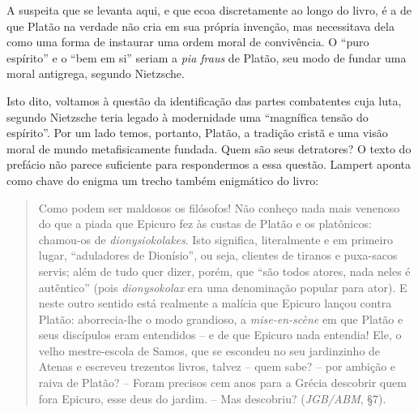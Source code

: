 \documentclass[
	12pt,				%
	openright,			%
	oneside,			%
	a4paper,			%
	english,			%
	french,				%
	spanish,			%
	brazil				%
	]{abntex2}
\begin{document}
	A suspeita que se levanta aqui, e que ecoa discretamente ao longo do livro, é a de que Platão na verdade não cria em sua própria invenção, mas necessitava dela como uma forma de instaurar uma ordem moral de convivência. O “puro espírito” e o “bem em si” seriam a \textit{pia fraus} de Platão, seu modo de fundar uma moral antigrega, segundo Nietzsche. 
	
	Isto dito, voltamos à questão da identificação das partes combatentes cuja luta, segundo Nietzsche teria legado à modernidade uma “magnífica tensão do espírito”. Por um lado temos, portanto, Platão, a tradição cristã e uma visão moral de mundo metafisicamente fundada. Quem são seus detratores? O texto do prefácio não parece suficiente para respondermos a essa questão. Lampert aponta como chave do enigma um trecho também enigmático do livro:

\begin{quotation}
Como podem ser maldosos os filósofos! Não conheço nada mais venenoso do que a piada que Epicuro fez às custas de Platão e os platônicos: chamou-os de \textit{dionysiokolakes}. Isto significa, literalmente e em primeiro lugar, “aduladores de Dionísio”, ou seja, clientes de tiranos e puxa-sacos servis; além de tudo quer dizer, porém, que “são todos atores, nada neles é autêntico” (pois \textit{dionysokolax} era uma denominação popular para ator). E neste outro sentido está realmente a malícia que Epicuro lançou contra Platão: aborrecia-lhe o modo grandioso, a \textit{mise-en-scène} em que Platão e seus discípulos eram entendidos – e de que Epicuro nada entendia! Ele, o velho mestre-escola de Samos, que se escondeu no seu jardinzinho de Atenas e escreveu trezentos livros, talvez – quem sabe? – por ambição e raiva de Platão? – Foram precisos cem anos para a Grécia descobrir quem fora Epicuro, esse deus do jardim. – Mas descobriu? (\textit{JGB/ABM}, §7).
\end{quotation}
\end{document}
